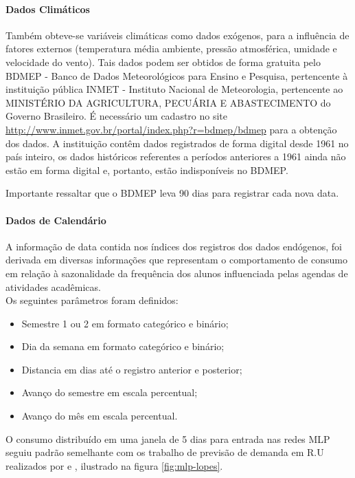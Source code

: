             \paragraph{Dados Climáticos}
            	Também obteve-se variáveis climáticas como dados exógenos, para a influência de fatores externos (temperatura média ambiente, pressão atmosférica, umidade e velocidade do vento). Tais dados podem ser obtidos de forma gratuita pelo BDMEP - Banco de Dados Meteorológicos para Ensino e Pesquisa, pertencente à instituição pública INMET - Instituto Nacional de Meteorologia, pertencente ao MINISTÉRIO DA AGRICULTURA, PECUÁRIA E ABASTECIMENTO do Governo Brasileiro. É necessário um cadastro no site \url{http://www.inmet.gov.br/portal/index.php?r=bdmep/bdmep} para a obtenção dos dados. A instituição contêm dados registrados de forma digital desde 1961 no país inteiro, os dados históricos referentes a períodos anteriores a 1961 ainda não estão em forma digital e, portanto, estão indisponíveis no BDMEP.
            	
            	Importante ressaltar que o BDMEP leva 90 dias para registrar cada nova data.
            	
        	\paragraph{Dados de Calendário}
            	A informação de data contida nos índices dos registros dos dados endógenos, foi derivada em diversas informações que representam o comportamento de consumo em relação à sazonalidade da frequência dos alunos influenciada pelas agendas de atividades acadêmicas.\\
            	Os seguintes parâmetros foram definidos:
            	\begin{itemize}
            	    \item Semestre 1 ou 2 em formato categórico e binário;
            	    \item Dia da semana em formato categórico e binário;
            	    \item Distancia em dias até o registro anterior e posterior;
            	    \item Avanço do semestre em escala percentual;
            	    \item Avanço do mês em escala percentual.
            	\end{itemize}
            	
            	O consumo distribuído em uma janela de 5 dias para entrada nas redes MLP seguiu padrão semelhante com os trabalho de previsão de demanda em R.U realizados por  e , ilustrado na figura \ref{fig:mlp-lopes}.
                
